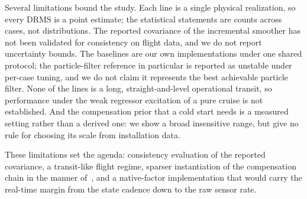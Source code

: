 Several limitations bound the study. Each line is a single physical
realization, so every DRMS is a point estimate; the statistical statements are
counts across cases, not distributions. The reported covariance of the
incremental smoother has not been validated for consistency on flight data,
and we do not report uncertainty bounds. The
baselines are our own implementations under one shared protocol; the
particle-filter reference in particular is reported as unstable under per-case
tuning, and we do not claim it represents the best achievable particle filter.
None of the lines is a long, straight-and-level operational transit, so
performance under the weak regressor excitation of a pure cruise is not
established. And the compensation prior that a cold start needs is a measured
setting rather than a derived one: we show a broad insensitive range, but give
no rule for choosing its scale from installation data.

These limitations set the agenda: consistency evaluation of the reported
covariance, a transit-like flight regime, sparser instantiation of the
compensation chain in the manner of~\cite{park2024}, and a native-factor
implementation that would carry the real-time margin from the state cadence
down to the raw sensor rate.
